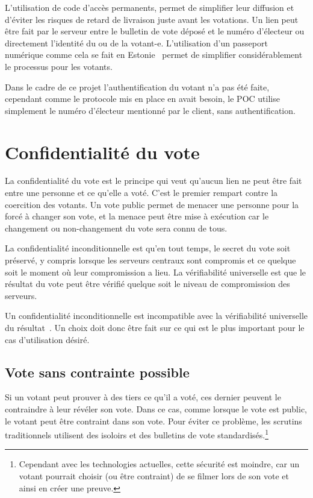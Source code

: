 \documentclass[../report]{subfiles}
\begin{document}
L'utilisation de code d'accès permanents, permet de simplifier leur diffusion et d'éviter les risques de retard de livraison juste avant les votations.
Un lien peut être fait par le serveur entre le bulletin de vote déposé et le numéro d'électeur ou directement l'identité du ou de la votant-e.
L'utilisation d'un passeport numérique comme cela se fait en Estonie~\cite{vassil_diffusion_2016} permet de simplifier considérablement le processus
pour les votants.

Dans le cadre de ce projet l'authentification du votant n'a pas été faite, cependant comme le protocole mis en place en avait besoin, le POC utilise 
simplement le numéro d'électeur mentionné par le client, sans authentification.

\section{Confidentialité du vote}

La confidentialité du vote est le principe qui veut qu'aucun lien ne peut être fait entre une personne et ce qu'elle a voté.
C'est le premier rempart contre la coercition des votants.
Un vote public permet de menacer une personne pour la forcé à changer son vote, et la menace peut être mise à exécution
car le changement ou non-changement du vote sera connu de tous.

La confidentialité inconditionnelle est qu'en tout temps, le secret du vote soit préservé, 
y compris lorsque les serveurs centraux sont compromis et ce quelque soit le moment où leur compromission a lieu.
La vérifiabilité universelle est que le résultat du vote peut être vérifié quelque soit le niveau de compromission
des serveurs.

Un confidentialité inconditionnelle est incompatible avec la vérifiabilité universelle du 
résultat~\cite{chevallier-mames_incompatible_2010,gharadaghy_verifiability_2010}.
Un choix doit donc être fait sur ce qui est le plus important pour le cas d'utilisation désiré.

\subsection{Vote sans contrainte possible}

Si un votant peut prouver à des tiers ce qu'il a voté, ces dernier peuvent le contraindre à leur révéler son vote.
Dans ce cas, comme lorsque le vote est public, le votant peut être contraint dans son vote. 
Pour éviter ce problème, les scrutins traditionnels utilisent des isoloirs et des bulletins de vote 
standardisés.\footnote{Cependant avec les technologies actuelles, cette sécurité est moindre, car un votant pourrait 
	choisir (ou être contraint) de se filmer lors de son vote et ainsi en créer une preuve.}
\end{document}
